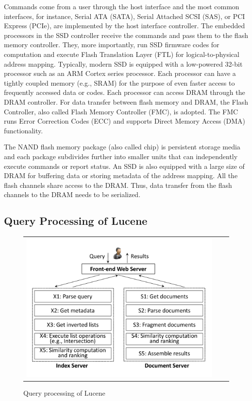 Commands come from a user through the host interface and the most common interfaces, for instance, Serial ATA (SATA), Serial Attached SCSI (SAS), or PCI Express (PCIe), are implemented by the host interface controller.
The embedded processors in the SSD controller receive the commands and pass them to the flash memory controller. They, more importantly, run SSD firmware codes for computation and execute Flash Translation Layer (FTL) for logical-to-physical address mapping. Typically, modern SSD is equipped with a low-powered 32-bit processor such as an ARM Cortex series processor. Each processor can have a tightly coupled memory (e.g., SRAM) for the purpose of even faster access to frequently accessed data or codes. Each processor can access DRAM through the DRAM controller. For data transfer between flash memory and DRAM, the Flash Controller, also called Flash Memory Controller (FMC), is adopted. The FMC runs Error Correction Codes (ECC) and supports Direct Memory Access (DMA) functionality.

The NAND flash memory package (also called chip) is persistent storage media and each package subdivides further into smaller units that can independently execute commands or report status. An SSD is also equipped with a large size of DRAM for buffering data or storing metadata of the address mapping. All the flash channels share access to the DRAM. Thus, data transfer from the flash channels to the DRAM needs to be serialized.


\subsection{Query Processing of Lucene}\label{sec:searchEngineArch}

\begin{figure}[htbp]
  \centering
  \begin{tabular}{ccc}
 \includegraphics[width=0.5\columnwidth]{figures/searchEngineArch.pdf}
\end{tabular}
  \caption{Query processing of Lucene}
  \label{fig:searchEngineArch}
 \end{figure}

